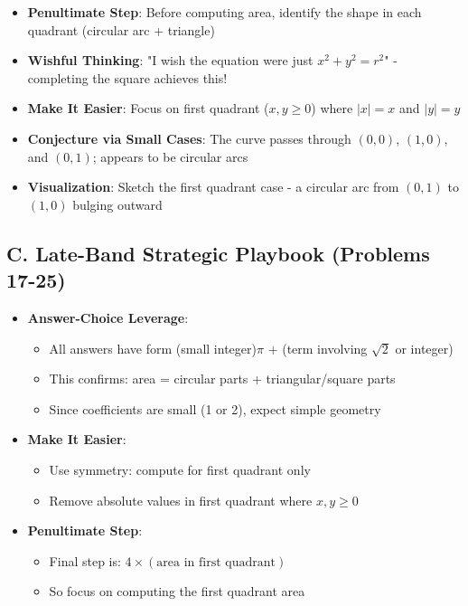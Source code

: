 \documentclass[]{article}
\begin{document}
\begin{strategicbox}
\begin{itemize}[leftmargin=*]
    \item \textbf{Penultimate Step}: Before computing area, identify the shape in each quadrant (circular arc + triangle)
    
    \item \textbf{Wishful Thinking}: "I wish the equation were just $x^2+y^2=r^2$" - completing the square achieves this!
    
    \item \textbf{Make It Easier}: Focus on first quadrant ($x,y \geq 0$) where $|x|=x$ and $|y|=y$
    
    \item \textbf{Conjecture via Small Cases}: The curve passes through $(0,0)$, $(1,0)$, and $(0,1)$; appears to be circular arcs
    
    \item \textbf{Visualization}: Sketch the first quadrant case - a circular arc from $(0,1)$ to $(1,0)$ bulging outward
\end{itemize}

\subsection*{C. Late-Band Strategic Playbook (Problems 17-25)}
\begin{itemize}[leftmargin=*]
    \item \textbf{Answer-Choice Leverage}: 
    \begin{itemize}
        \item All answers have form (small integer)$\pi$ + (term involving $\sqrt{2}$ or integer)
        \item This confirms: area = circular parts + triangular/square parts
        \item Since coefficients are small (1 or 2), expect simple geometry
    \end{itemize}
    
    \item \textbf{Make It Easier}: 
    \begin{itemize}
        \item Use symmetry: compute for first quadrant only
        \item Remove absolute values in first quadrant where $x,y \geq 0$
    \end{itemize}
    
    \item \textbf{Penultimate Step}: 
    \begin{itemize}
        \item Final step is: $4 \times (\text{area in first quadrant})$
        \item So focus on computing the first quadrant area
    \end{itemize}
    

\end{itemize}
\end{strategicbox}
\end{document}
